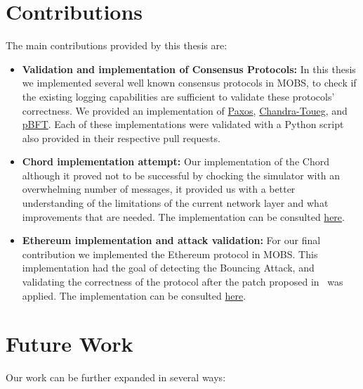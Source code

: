 \section{Contributions}\label{sub:contributions}

The main contributions provided by this thesis are:

\begin{itemize}
    \item \textbf{Validation and implementation of Consensus Protocols:} In
    this thesis we implemented several well known consensus protocols in MOBS,
    to check if the existing logging capabilities are sufficient to validate
    these protocols' correctness. We provided an implementation of
    \href{https://github.com/RMLoureiro/MOBS/pull/2}{Paxos}, \href{https://github.com/RMLoureiro/MOBS/pull/4}{Chandra-Toueg},
    and \href{https://github.com/RMLoureiro/MOBS/pull/6}{pBFT}. Each of these implementations
    were validated with a Python script also provided in their respective pull requests.


    \item \textbf{Chord implementation attempt:} Our implementation of the Chord
    although it proved not to be successful by chocking the simulator with an
    overwhelming number of messages, it provided us with a better understanding
    of the limitations of the current network layer and what improvements that are needed.
    The implementation can be consulted \href{https://github.com/RMLoureiro/MOBS/pull/1}{here}.


    \item \textbf{Ethereum implementation and attack validation:} For our final contribution
    we implemented the Ethereum protocol in MOBS. This implementation had the goal of
    detecting the Bouncing Attack, and validating the correctness of the protocol after the
    patch proposed in~\cite{ethereum_analysis} was applied. The implementation can be consulted
    \href{https://github.com/RMLoureiro/MOBS/pull/7}{here}.
\end{itemize}

\section{Future Work}\label{sub:future_work}

Our work can be further expanded in several ways:

